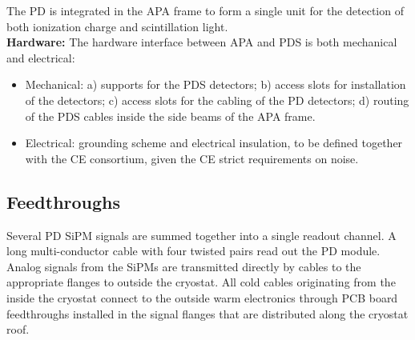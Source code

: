 

The PD is integrated in the APA frame to form a single unit for the detection of both ionization charge and scintillation light.\\

\textbf{Hardware:}
The hardware interface between APA and PDS is both mechanical and electrical: 
\begin{itemize}
\item Mechanical: a) supports for the PDS detectors; b) access slots for installation of the detectors;
 c) access slots for the cabling of the PD detectors; d) routing of the PDS cables inside the side beams of the APA frame.
\item Electrical: grounding scheme and electrical insulation, to be defined together with the CE consortium, given the CE strict requirements on noise.
\end{itemize}


\subsection{Feedthroughs}
\label{sec:fdsp-pd-intfc-feed}

Several PD SiPM signals are summed together into a single readout channel. A long multi-conductor cable with four twisted pairs read out the PD module. 
Analog signals from the SiPMs are transmitted directly by cables to the appropriate flanges to outside the cryostat. 
All cold cables originating from the inside the cryostat connect to the outside warm electronics through PCB board feedthroughs installed in the signal flanges that are distributed along the cryostat roof.

